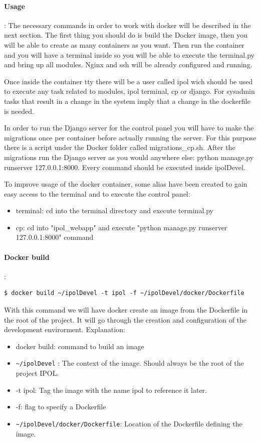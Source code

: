 \documentclass[a4paper,12pt]{article}
\begin{document}
\paragraph{Usage}:
The necessary commands in order to work with docker will be described in the next section. The first thing you should do is
build the Docker image, then you will be able to create as many containers as you want. Then run the container and you
will have a terminal inside so you will be able to execute the terminal.py and bring up all modules. Nginx and ssh will be already
configured and running.

Once inside the container tty there will be a user called ipol wich should be used to execute any task related to modules, ipol terminal, 
cp or django. For sysadmin tasks that result in a change in the system imply that a change in the dockerfile is needed.
 
In order to run the Django server for the control panel you will have to make the migrations once per
container before actually running the server. For this purpose there is a script under the Docker folder called migrations\_cp.sh.
 After the migrations run the Django server as you would anywhere else: python manage.py runserver 127.0.0.1:8000.
 Every command should be executed inside ipolDevel.
 
 To improve usage of the docker container, some alias have been created to gain easy access to the terminal and to execute the control panel:
 \begin{itemize}
 	\item terminal: cd into the terminal directory and execute terminal.py
 	\item cp: cd into "ipol\_webapp" and execute "python manage.py runserver 127.0.0.1:8000" command
 \end{itemize}
 


\paragraph{Docker build}:\\
\begin{lstlisting}[firstnumber=1,breaklines]
  $ docker build ~/ipolDevel -t ipol -f ~/ipolDevel/docker/Dockerfile
\end{lstlisting}

With this command we will have docker create an image from the Dockerfile in the root of the project. It will go through the creation and configuration of the development envirorment. Explanation:
\begin{itemize}
  \item docker build: command to build an image
  \item {\tt \~{}/ipolDevel} : The context of the image. Should always be the root of the project IPOL.
  \item -t ipol: Tag the image with the name ipol to reference it later.
  \item -f: flag to specify a Dockerfile
  \item {\tt \~{}/ipolDevel/docker/Dockerfile}: Location of the Dockerfile defining the image.
\end{itemize}
\end{document}
